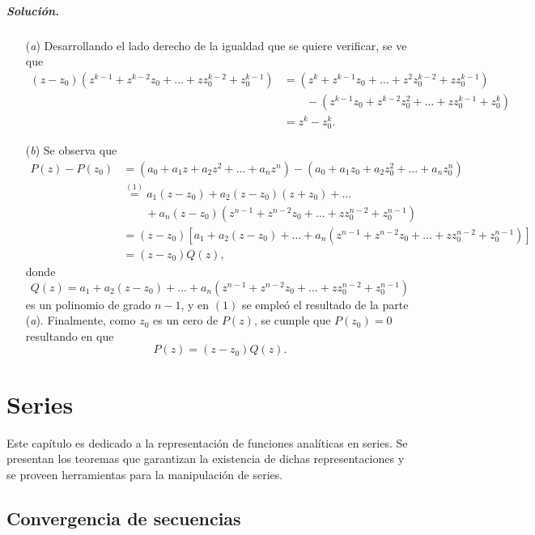 \documentclass[a4paper]{report}
\begin{document}
\paragraph{Solución.} 
\begin{enumerate}
 \item[(\textit{a})] Desarrollando el lado derecho de la igualdad que se quiere verificar, se ve que 
 \begin{align*}
  (z-z_0)(z^{k-1}+z^{k-2}z_0+\dots+zz_0^{k-2}+z_0^{k-1})&=(z^k+z^{k-1}z_0+\dots+z^2z_0^{k-2}+zz_0^{k-1})\\
   &\qquad-(z^{k-1}z_0+z^{k-2}z_0^2+\dots+zz_0^{k-1}+z_0^k)\\
   &=z^k-z_0^k.
 \end{align*}
 \item[(\textit{b})] Se observa que 
 \begin{align*}
  P(z)-P(z_0)&=(a_0+a_1z+a_2z^2+\dots+a_nz^n)-(a_0+a_1z_0+a_2z_0^2+\dots+a_nz_0^n)\\
   &\overset{(1)}{=}a_1(z-z_0)+a_2(z-z_0)(z+z_0)+\dots\\
   &\qquad+a_n(z-z_0)(z^{n-1}+z^{n-2}z_0+\dots+zz_0^{n-2}+z_0^{n-1})\\
   &=(z-z_0)\left[a_1+a_2(z-z_0)+\dots+a_n(z^{n-1}+z^{n-2}z_0+\dots+zz_0^{n-2}+z_0^{n-1})\right]\\
   &=(z-z_0)Q(z),
 \end{align*}
donde 
\[
 Q(z)=a_1+a_2(z-z_0)+\dots+a_n(z^{n-1}+z^{n-2}z_0+\dots+zz_0^{n-2}+z_0^{n-1})
\]
es un polinomio de grado \(n-1\), y en \((1)\) se empleó el resultado de la parte (\textit{a}). Finalmente, como \(z_0\) es un cero de \(P(z)\), se cumple que \(P(z_0)=0\) resultando en que 
\[
 P(z)=(z-z_0)Q(z).
\]
\end{enumerate}

\chapter{Series}

Este capítulo es dedicado a la representación de funciones analíticas en series. Se presentan los teoremas que garantizan la existencia de dichas representaciones y se proveen herramientas para la manipulación de series.

\section{Convergencia de secuencias}\label{sec:convergence_of_sequences}
\end{document}
